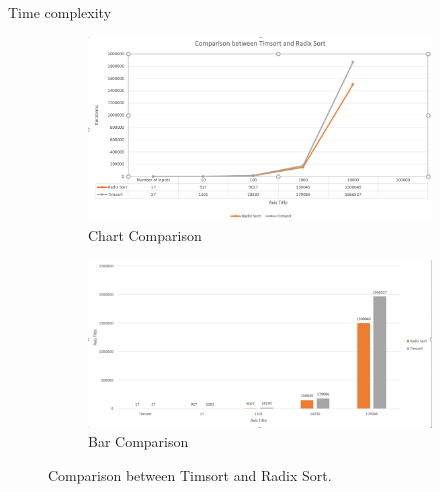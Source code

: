 \documentclass{beamer}
\begin{document}
\begin{frame}{Time complexity}
    \begin{figure}[h]
        \centering
        \begin{subfigure}{.49\textwidth}
            \includegraphics[width=\linewidth]{chart.png}
            \caption{Chart Comparison}
            \label{fig:subfig1}
        \end{subfigure}
        \hfill
        \begin{subfigure}{.49\textwidth}
            \includegraphics[width=\linewidth]{bar.png}
            \caption{Bar Comparison}
            \label{fig:subfig2}
        \end{subfigure}
        \caption{Comparison between Timsort and Radix Sort.}
        \label{fig:both}
    \end{figure}
\end{frame}

\end{document}
